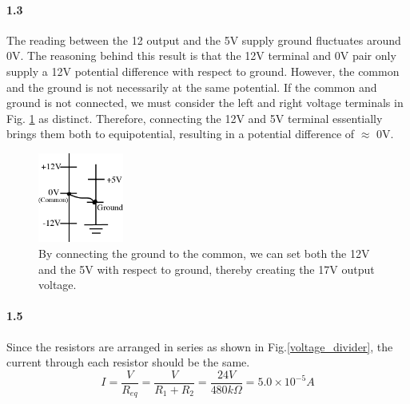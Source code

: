\documentclass[authoryear, 12pt,5p, times]{elsarticle}
\begin{document}
\paragraph{\textbf{1.3}} 
The reading between the 12 output and the 5V supply ground fluctuates around 0V. The reasoning behind this result is that the 12V terminal and 0V pair only supply a 12V potential difference with respect to ground. However, the common and the ground is not necessarily at the same potential.  If the common and ground is not connected, we must consider the left and right voltage terminals in Fig. \ref{ground_common} as distinct. Therefore, connecting the 12V and 5V terminal essentially brings them both to equipotential, resulting in a potential difference of $\approx$  0V.
\begin{figure}[h!]
\center
\includegraphics[width=0.25\textwidth]{figure/ground_common}
\caption{By connecting the ground to the common, we can set both the 12V and the 5V with respect to ground, thereby creating the 17V output voltage.}
\label{ground_common}
\end{figure}

\paragraph{\textbf{1.5}} \label{1_5}
Since the resistors are arranged in series as shown in Fig.\ref{voltage_divider}, the current through each resistor should be the same.  
\begin{equation}
I=\frac{V}{R_{eq}}=\frac{V}{R_1+R_2}=\frac{24V}{480k\Omega
}= 5.0\times10^{-5}A 
\end{equation}

\end{document}

